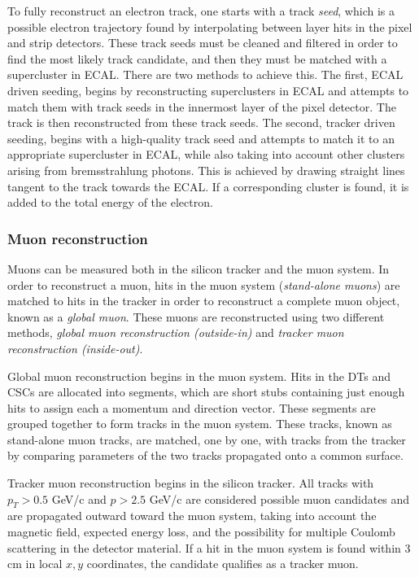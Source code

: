 To fully reconstruct an electron track, one starts with a track \emph{seed}, which is a possible electron trajectory found by interpolating between layer hits in the pixel and strip detectors. These track seeds must be cleaned and filtered in order to find the most likely track candidate, and then they must be matched with a supercluster in ECAL. There are two methods to achieve this. The first, ECAL driven seeding, begins by reconstructing superclusters in ECAL and attempts to match them with track seeds in the innermost layer of the pixel detector. The track is then reconstructed from these track seeds. The second, tracker driven seeding, begins with a high-quality track seed and attempts to match it to an appropriate supercluster in ECAL, while also taking into account other clusters arising from bremsstrahlung photons. This is achieved by drawing straight lines tangent to the track towards the ECAL. If a corresponding cluster is found, it is added to the total energy of the electron.

\subsubsection{Muon reconstruction}

Muons can be measured both in the silicon tracker and the muon system. In order to reconstruct a muon, hits in the muon system (\emph{stand-alone muons}) are matched to hits in the tracker in order to reconstruct a complete muon object, known as a \emph{global muon}. These muons are reconstructed using two different methods, \emph{global muon reconstruction (outside-in)} and \emph{tracker muon reconstruction (inside-out)}.

Global muon reconstruction begins in the muon system. Hits in the DTs and CSCs are allocated into segments, which are short stubs containing just enough hits to assign each a momentum and direction vector. These segments are grouped together to form tracks in the muon system. These tracks, known as stand-alone muon tracks, are matched, one by one, with tracks from the tracker by comparing parameters of the two tracks propagated onto a common surface.

Tracker muon reconstruction begins in the silicon tracker. All tracks with $p_{T} > 0.5$ GeV/c and $p > 2.5$ GeV/c are considered possible muon candidates and are propagated outward toward the muon system, taking into account the magnetic field, expected energy loss, and the possibility for multiple Coulomb scattering in the detector material. If a hit in the muon system is found within 3 cm in local $x, y$ coordinates, the candidate qualifies as a tracker muon.

